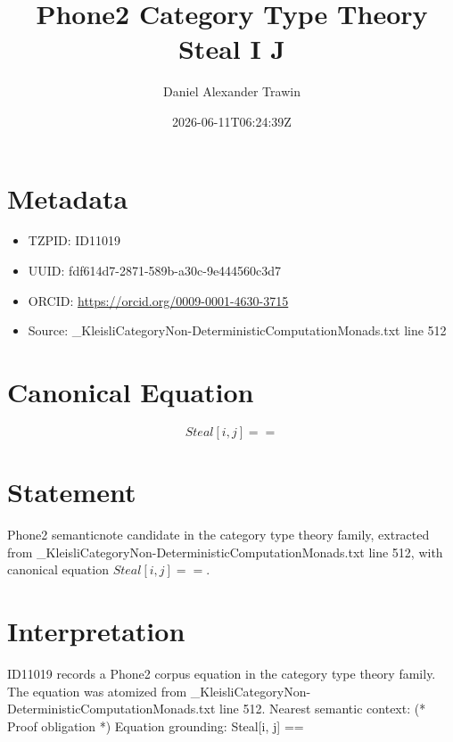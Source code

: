 \documentclass[11pt]{article}
\title{Phone2 Category Type Theory Steal I J}
\author{Daniel Alexander Trawin}
\date{2026-06-11T06:24:39Z}
\begin{document}
\maketitle
\section*{Metadata}
\begin{itemize}
\item TZPID: ID11019
\item UUID: fdf614d7-2871-589b-a30c-9e444560c3d7
\item ORCID: \url{https://orcid.org/0009-0001-4630-3715}
\item Source: _KleisliCategoryNon-DeterministicComputationMonads.txt line 512
\end{itemize}
\section*{Canonical Equation}
\[
Steal[i, j] ==
\]
\section*{Statement}
Phone2 semanticnote candidate in the category type theory family, extracted from _KleisliCategoryNon-DeterministicComputationMonads.txt line 512, with canonical equation $Steal[i, j] ==$.
\section*{Interpretation}
ID11019 records a Phone2 corpus equation in the category type theory family. The equation was atomized from _KleisliCategoryNon-DeterministicComputationMonads.txt line 512. Nearest semantic context: (* Proof obligation *) Equation grounding: Steal[i, j] ==
\end{document}
